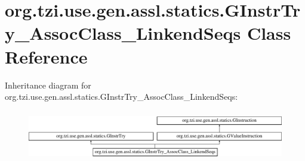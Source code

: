 \hypertarget{classorg_1_1tzi_1_1use_1_1gen_1_1assl_1_1statics_1_1_g_instr_try___assoc_class___linkend_seqs}{\section{org.\-tzi.\-use.\-gen.\-assl.\-statics.\-G\-Instr\-Try\-\_\-\-Assoc\-Class\-\_\-\-Linkend\-Seqs Class Reference}
\label{classorg_1_1tzi_1_1use_1_1gen_1_1assl_1_1statics_1_1_g_instr_try___assoc_class___linkend_seqs}
}
Inheritance diagram for org.\-tzi.\-use.\-gen.\-assl.\-statics.\-G\-Instr\-Try\-\_\-\-Assoc\-Class\-\_\-\-Linkend\-Seqs\-:\begin{figure}[H]
\begin{center}
\leavevmode
\includegraphics[height=2.234043cm]{classorg_1_1tzi_1_1use_1_1gen_1_1assl_1_1statics_1_1_g_instr_try___assoc_class___linkend_seqs}
\end{center}
\end{figure}
